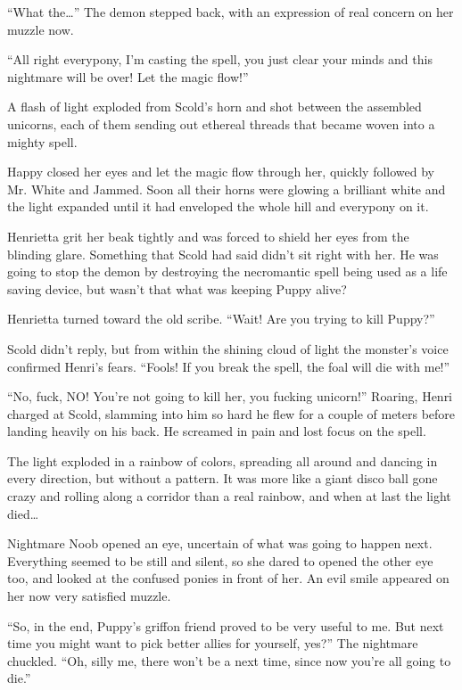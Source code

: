 ``What the\dots'' The demon stepped back, with an expression of real concern on her muzzle now.

``All right everypony, I'm casting the spell, you just clear your minds and this nightmare will be over! Let the magic flow!''

A flash of light exploded from Scold's horn and shot between the assembled unicorns, each of them sending out ethereal threads that became woven into a mighty spell.

Happy closed her eyes and let the magic flow through her, quickly followed by Mr. White and Jammed. Soon all their horns were glowing a brilliant white and the light expanded until it had enveloped the whole hill and everypony on it.

Henrietta grit her beak tightly and was forced to shield her eyes from the blinding glare. Something that Scold had said didn't sit right with her. He was going to stop the demon by destroying the necromantic spell being used as a life saving device, but wasn't that what was keeping Puppy alive?

Henrietta turned toward the old scribe. ``Wait! Are you trying to kill Puppy?''

Scold didn't reply, but from within the shining cloud of light the monster's voice confirmed Henri's fears. ``Fools! If you break the spell, the foal will die with me!''

``No, fuck, NO! You're not going to kill her, you fucking unicorn!'' Roaring, Henri charged at Scold, slamming into him so hard he flew for a couple of meters before landing heavily on his back. He screamed in pain and lost focus on the spell.

The light exploded in a rainbow of colors, spreading all around and dancing in every direction, but without a pattern. It was more like a giant disco ball gone crazy and rolling along a corridor than a real rainbow, and when at last the light died\dots

Nightmare Noob opened an eye, uncertain of what was going to happen next. Everything seemed to be still and silent, so she dared to opened the other eye too, and looked at the confused ponies in front of her. An evil smile appeared on her now very satisfied muzzle.

``So, in the end, Puppy's griffon friend proved to be very useful to me. But next time you might want to pick better allies for yourself, yes?'' The nightmare chuckled. ``Oh, silly me, there won't be a next time, since now you're all going to die.''

